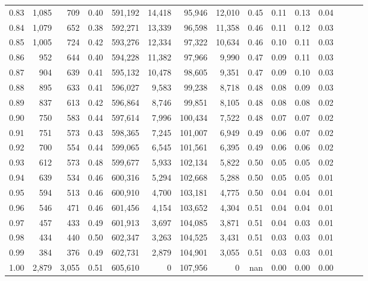 \begin{tabular}{rrrrrrrrrrrrrrr}
0.83 &   1,085 &    709 &  0.40 &  591,192 &   14,418 &   95,946 &   12,010 &  0.45 &  0.11 &  0.13 &      0.04 \\
0.84 &   1,079 &    652 &  0.38 &  592,271 &   13,339 &   96,598 &   11,358 &  0.46 &  0.11 &  0.12 &      0.03 \\
0.85 &   1,005 &    724 &  0.42 &  593,276 &   12,334 &   97,322 &   10,634 &  0.46 &  0.10 &  0.11 &      0.03 \\
0.86 &     952 &    644 &  0.40 &  594,228 &   11,382 &   97,966 &    9,990 &  0.47 &  0.09 &  0.11 &      0.03 \\
0.87 &     904 &    639 &  0.41 &  595,132 &   10,478 &   98,605 &    9,351 &  0.47 &  0.09 &  0.10 &      0.03 \\
0.88 &     895 &    633 &  0.41 &  596,027 &    9,583 &   99,238 &    8,718 &  0.48 &  0.08 &  0.09 &      0.03 \\
0.89 &     837 &    613 &  0.42 &  596,864 &    8,746 &   99,851 &    8,105 &  0.48 &  0.08 &  0.08 &      0.02 \\
0.90 &     750 &    583 &  0.44 &  597,614 &    7,996 &  100,434 &    7,522 &  0.48 &  0.07 &  0.07 &      0.02 \\
0.91 &     751 &    573 &  0.43 &  598,365 &    7,245 &  101,007 &    6,949 &  0.49 &  0.06 &  0.07 &      0.02 \\
0.92 &     700 &    554 &  0.44 &  599,065 &    6,545 &  101,561 &    6,395 &  0.49 &  0.06 &  0.06 &      0.02 \\
0.93 &     612 &    573 &  0.48 &  599,677 &    5,933 &  102,134 &    5,822 &  0.50 &  0.05 &  0.05 &      0.02 \\
0.94 &     639 &    534 &  0.46 &  600,316 &    5,294 &  102,668 &    5,288 &  0.50 &  0.05 &  0.05 &      0.01 \\
0.95 &     594 &    513 &  0.46 &  600,910 &    4,700 &  103,181 &    4,775 &  0.50 &  0.04 &  0.04 &      0.01 \\
0.96 &     546 &    471 &  0.46 &  601,456 &    4,154 &  103,652 &    4,304 &  0.51 &  0.04 &  0.04 &      0.01 \\
0.97 &     457 &    433 &  0.49 &  601,913 &    3,697 &  104,085 &    3,871 &  0.51 &  0.04 &  0.03 &      0.01 \\
0.98 &     434 &    440 &  0.50 &  602,347 &    3,263 &  104,525 &    3,431 &  0.51 &  0.03 &  0.03 &      0.01 \\
0.99 &     384 &    376 &  0.49 &  602,731 &    2,879 &  104,901 &    3,055 &  0.51 &  0.03 &  0.03 &      0.01 \\
1.00 &   2,879 &  3,055 &  0.51 &  605,610 &        0 &  107,956 &        0 &   nan &  0.00 &  0.00 &      0.00 \\
\bottomrule
\end{tabular}
